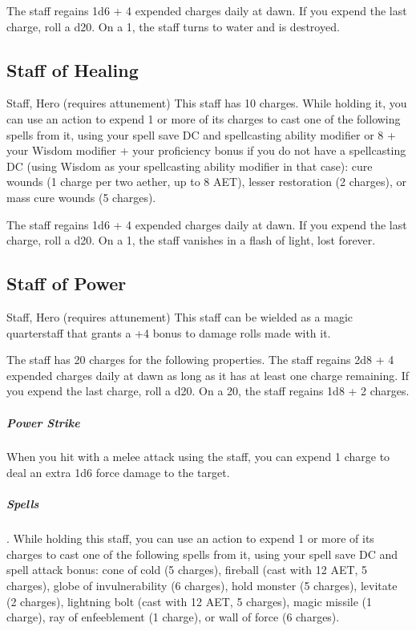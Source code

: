 The staff regains 1d6 + 4 expended charges daily at dawn. If you expend the last charge, roll a d20. On a 1, the staff turns to water and is destroyed.

\subsection{Staff of Healing}
Staff, Hero (requires attunement)
This staff has 10 charges. While holding it, you can use an action to expend 1 or more of its charges to cast one of the following spells from it, using your spell save DC and spellcasting ability modifier or 8 + your Wisdom modifier + your proficiency bonus if you do not have a spellcasting DC (using Wisdom as your spellcasting ability modifier in that case): cure wounds (1 charge per two aether, up to 8 AET), lesser restoration (2 charges), or mass cure wounds (5 charges).

The staff regains 1d6 + 4 expended charges daily at dawn. If you expend the last charge, roll a d20. On a 1, the staff vanishes in a flash of light, lost forever.

\subsection{Staff of Power}
Staff, Hero (requires attunement)
This staff can be wielded as a magic quarterstaff that grants a +4 bonus to damage rolls made with it.

The staff has 20 charges for the following properties. The staff regains 2d8 + 4 expended charges daily at dawn as long as it has at least one charge remaining. If you expend the last charge, roll a d20. On a 20, the staff regains 1d8 + 2 charges.

\subparagraph*{Power Strike} When you hit with a melee attack using the staff, you can expend 1 charge to deal an extra 1d6 force damage to the target.

\subparagraph*{Spells}. While holding this staff, you can use an action to expend 1 or more of its charges to cast one of the following spells from it, using your spell save DC and spell attack bonus: cone of cold (5 charges), fireball (cast with 12 AET, 5 charges), globe of invulnerability (6 charges), hold monster (5 charges), levitate (2 charges), lightning bolt (cast with 12 AET, 5 charges), magic missile (1 charge), ray of enfeeblement (1 charge), or wall of force (6 charges).

